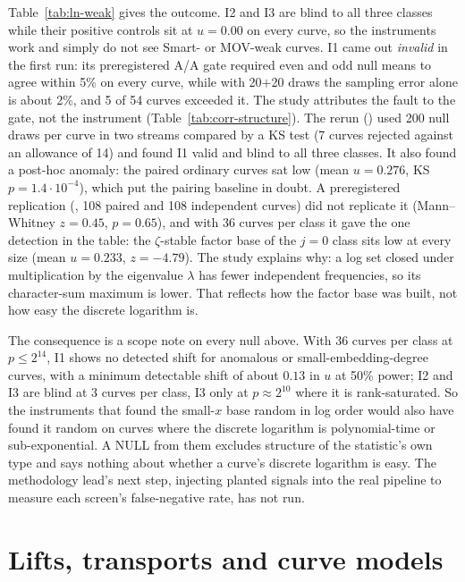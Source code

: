 Table~\ref{tab:ln-weak} gives the outcome. I2 and I3 are blind to all three
classes while their positive controls sit at $u=0.00$ on every curve, so the
instruments work and simply do not see Smart- or MOV-weak curves. I1 came out
\emph{invalid} in the first run: its preregistered A/A gate required even and
odd null means to agree within 5\% on every curve, while with 20$+$20 draws the
sampling error alone is about 2\%, and 5 of 54 curves exceeded it. The study
attributes the fault to the gate, not the instrument
(Table~\ref{tab:corr-structure}). The rerun
()
used 200 null draws per curve in two streams compared by a KS test (7 curves
rejected against an allowance of 14) and found I1 valid and blind to all
three classes. It also found a post-hoc anomaly: the paired ordinary curves
sat low (mean $u=0.276$, KS $p=1.4\cdot10^{-4}$), which put the pairing baseline in
doubt. A preregistered replication
(,
108 paired and 108 independent curves) did not replicate it (Mann--Whitney
$z=0.45$, $p=0.65$), and with 36 curves per class it gave the one detection
in the table: the $\zeta$-stable factor base of the $j=0$ class sits low at every
size (mean $u=0.233$, $z=-4.79$). The study explains why: a log set closed under
multiplication by the eigenvalue $\lambda$ has fewer independent frequencies,
so its character-sum maximum is lower. That reflects how the factor base was
built, not how easy the discrete logarithm is.

The consequence is a scope note on every null above. With 36 curves per class
at $p\le2^{14}$, I1 shows no detected shift for anomalous or small-embedding-degree
curves, with a minimum detectable shift of about $0.13$ in $u$ at 50\% power;
I2 and I3 are blind at 3 curves per class, I3 only at $p\approx2^{10}$ where it is
rank-saturated. So the instruments that found the small-$x$ base random in log
order would also have found it random on curves where the discrete logarithm
is polynomial-time or sub-exponential. A NULL from them excludes structure of
the statistic's own type and says nothing about whether a curve's discrete
logarithm is easy. The methodology lead's next step, injecting planted
signals into the real pipeline to measure each screen's false-negative rate,
has not run.

\section{Lifts, transports and curve models}\label{sec:ln-models}

